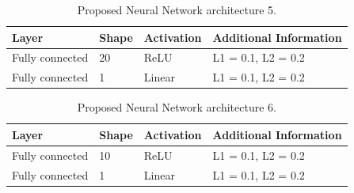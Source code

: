 \documentclass[preprint,12pt]{elsarticle}%
\begin{document}
\begin{table}[tbh]
\centering
\caption{Proposed Neural Network architecture 5.}%
\begin{tabular}
[c]{llll}\hline
Layer & Shape & Activation & Additional Information\\\hline\hline
Fully connected & 20 & ReLU & L1 = 0.1, L2 = 0.2\\
Fully connected & 1 & Linear & L1 = 0.1, L2 = 0.2\\\hline
\end{tabular}
\label{table:proposed_nn_5}%
\end{table}

\begin{table}[tbh]
\centering
\caption{Proposed Neural Network architecture 6.}%
\begin{tabular}
[c]{llll}\hline
Layer & Shape & Activation & Additional Information\\\hline\hline
Fully connected & 10 & ReLU & L1 = 0.1, L2 = 0.2\\
Fully connected & 1 & Linear & L1 = 0.1, L2 = 0.2\\\hline
\end{tabular}
\label{table:proposed_nn_6}%
\end{table}

\end{document}
